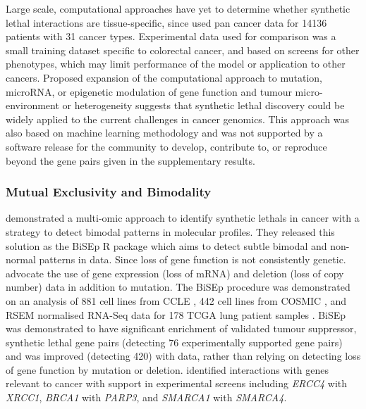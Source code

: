 Large scale, computational approaches have yet to determine whether \gls{synthetic lethal} interactions are tissue-specific, since \citet{Lu2015} used \gls{pan cancer} data for 14136 patients with 31 cancer types. Experimental data used for comparison was a small training dataset specific to colorectal cancer, and based on screens for other phenotypes, which may limit performance of the model or application to other cancers. Proposed expansion of the computational approach to \gls{mutation}, \gls{microRNA}, or epigenetic modulation of gene function and tumour micro-environment or heterogeneity suggests that \gls{synthetic lethal} discovery could be widely applied to the current challenges in cancer \glspl{genomic}. This approach was also based on machine learning methodology and was not supported by a software release for the community to develop, contribute to, or reproduce beyond the gene pairs given in the supplementary results. 

\subsubsection{Mutual Exclusivity and Bimodality}

\citet{Wappett2016} demonstrated a multi-omic approach to identify \glspl{synthetic lethal} in cancer with a strategy to detect bimodal patterns in \glspl{molecular profile}. They released this solution as the \gls{BiSEp} R package \citep{Wappett2014} which aims to detect subtle bimodal and non-normal patterns in  data. Since loss of gene function is not consistently genetic. \citet{Wappett2016} advocate the use of \gls{gene expression} (loss of \acrshort{mRNA}) and deletion (loss of copy number) data in addition to \gls{mutation}. The \gls{BiSEp} procedure was demonstrated on an analysis of 881 cell lines from \gls{CCLE} \citep{Barretina2012}, 442 cell lines from \gls{COSMIC} \citep{Forbes2015}, and \gls{RSEM} normalised \gls{RNA-Seq} data for 178 \gls{TCGA} lung patient samples \citep{TCGA2014LU}. \gls{BiSEp} was demonstrated to have significant enrichment of validated \gls{tumour suppressor}, \gls{synthetic lethal} gene pairs (detecting 76 experimentally supported gene pairs) and was improved (detecting 420) with  data, rather than relying on detecting loss of gene function by \gls{mutation} or deletion. \citet{Wappett2016} identified interactions with genes relevant to cancer with support in experimental screens including \textit{ERCC4} with \textit{XRCC1}, \textit{BRCA1} with \textit{PARP3}, and \textit{SMARCA1} with \textit{SMARCA4}.

